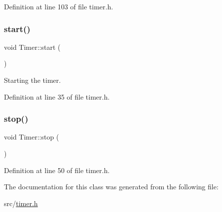 Definition at line 103 of file timer.\+h.

\mbox{\label{classTimer_a3a8b5272198d029779dc9302a54305a8}} 
\subsubsection{\texorpdfstring{start()}{start()}}
{\footnotesize\ttfamily void Timer\+::start (\begin{DoxyParamCaption}{ }\end{DoxyParamCaption})\hspace{0.3cm}{\ttfamily [inline]}}



Starting the timer. 



Definition at line 35 of file timer.\+h.

\mbox{\label{classTimer_a63f0eb44b27402196590a03781515dba}} 
\subsubsection{\texorpdfstring{stop()}{stop()}}
{\footnotesize\ttfamily void Timer\+::stop (\begin{DoxyParamCaption}{ }\end{DoxyParamCaption})\hspace{0.3cm}{\ttfamily [inline]}}



Definition at line 50 of file timer.\+h.



The documentation for this class was generated from the following file\+:\begin{DoxyCompactItemize}
\item 
src/\hyperlink{timer_8h}{timer.\+h}\end{DoxyCompactItemize}
